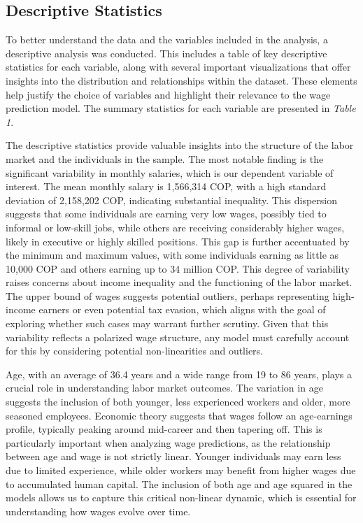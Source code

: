 \documentclass[11pt,a4paper,onecolumn]{article}
\begin{document}
    \subsection{Descriptive Statistics}

    To better understand the data and the variables included in the analysis, a descriptive analysis was conducted. This includes a table of key descriptive statistics for each variable, along with several important visualizations that offer insights into the distribution and relationships within the dataset. These elements help justify the choice of variables and highlight their relevance to the wage prediction model. The summary statistics for each variable are presented in \textit{Table 1}.


    The descriptive statistics provide valuable insights into the structure of the labor market and the individuals in the sample. The most notable finding is the significant variability in monthly salaries, which is our dependent variable of interest. The mean monthly salary is 1,566,314 COP, with a high standard deviation of 2,158,202 COP, indicating substantial inequality. This dispersion suggests that some individuals are earning very low wages, possibly tied to informal or low-skill jobs, while others are receiving considerably higher wages, likely in executive or highly skilled positions. This gap is further accentuated by the minimum and maximum values, with some individuals earning as little as 10,000 COP and others earning up to 34 million COP. This degree of variability raises concerns about income inequality and the functioning of the labor market. The upper bound of wages suggests potential outliers, perhaps representing high-income earners or even potential tax evasion, which aligns with the goal of exploring whether such cases may warrant further scrutiny. Given that this variability reflects a polarized wage structure, any model must carefully account for this by considering potential non-linearities and outliers.

    Age, with an average of 36.4 years and a wide range from 19 to 86 years, plays a crucial role in understanding labor market outcomes. The variation in age suggests the inclusion of both younger, less experienced workers and older, more seasoned employees. Economic theory suggests that wages follow an age-earnings profile, typically peaking around mid-career and then tapering off. This is particularly important when analyzing wage predictions, as the relationship between age and wage is not strictly linear. Younger individuals may earn less due to limited experience, while older workers may benefit from higher wages due to accumulated human capital. The inclusion of both age and age squared in the models allows us to capture this critical non-linear dynamic, which is essential for understanding how wages evolve over time.
    
\end{document}
